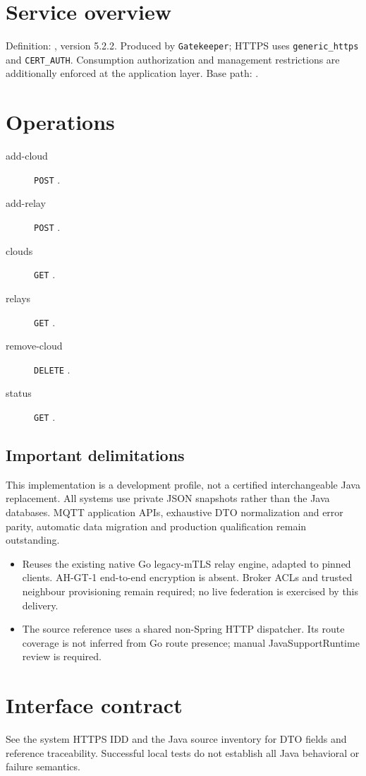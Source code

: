 \documentclass[a4paper]{arrowhead}
\begin{document}
\ArrowheadSetup
\section{Service overview}
Definition: , version 5.2.2. Produced by \texttt{Gatekeeper}; HTTPS uses \texttt{generic\_https} and \texttt{CERT\_AUTH}. Consumption authorization and management restrictions are additionally enforced at the application layer. Base path: .
\section{Operations}
\begin{description}
\item[add-cloud] \texttt{POST} .
\item[add-relay] \texttt{POST} .
\item[clouds] \texttt{GET} .
\item[relays] \texttt{GET} .
\item[remove-cloud] \texttt{DELETE} .
\item[status] \texttt{GET} .
\end{description}
\subsection{Important delimitations}
This implementation is a development profile, not a certified interchangeable Java replacement. All systems use private JSON snapshots rather than the Java databases. MQTT application APIs, exhaustive DTO normalization and error parity, automatic data migration and production qualification remain outstanding.
\begin{itemize}
\item Reuses the existing native Go legacy-mTLS relay engine, adapted to pinned clients. AH-GT-1 end-to-end encryption is absent. Broker ACLs and trusted neighbour provisioning remain required; no live federation is exercised by this delivery.
\item The source reference uses a shared non-Spring HTTP dispatcher. Its route coverage is not inferred from Go route presence; manual JavaSupportRuntime review is required.
\end{itemize}
\section{Interface contract}
See the system HTTPS IDD and the Java source inventory for DTO fields and reference traceability. Successful local tests do not establish all Java behavioral or failure semantics.
\end{document}
